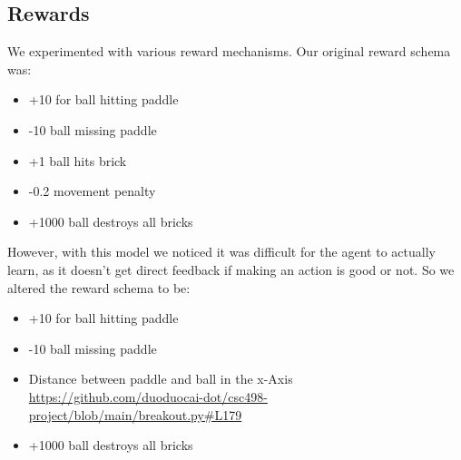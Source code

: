 \documentclass[twoside,11pt]{article}
\begin{document}
\subsection{Rewards}
We experimented with various reward mechanisms. Our original reward schema was:
\begin{itemize}
\item +10 for ball hitting paddle
\item -10 ball missing paddle
\item +1 ball hits brick
\item -0.2 movement penalty
\item +1000 ball destroys all bricks
\end{itemize}
However, with this model we noticed it was difficult for the agent to actually learn, as it doesn't get direct feedback if making an action is good or not. So we altered the reward schema to be:
\begin{itemize}
\item +10 for ball hitting paddle
\item -10 ball missing paddle
\item Distance between paddle and ball in the x-Axis \url{https://github.com/duoduocai-dot/csc498-project/blob/main/breakout.py#L179}
\item +1000 ball destroys all bricks
\end{itemize}
\end{document}
